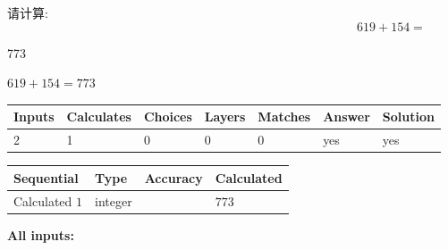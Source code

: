 \documentclass{ctexart}
\begin{document}
请计算:
\begin{equation}
619 +  %
154 = \nonumber
\end{equation}
 
 
 
\noindent{}
 
 

773
 
 
\noindent{}
 
 

 
 
 
\noindent{}
 
 

$ %
619 +  %
154=   %
773$
 
 
\noindent{}
 
 

 
   
   
   
   
\noindent\begin{tabular}{|l|l|l|l|l|l|l|}
 \hline
Inputs & Calculates & Choices & Layers & Matches & Answer & Solution \\ \hline
 2  & 
 1  & 
 0
  & 
 0  & 
 0  & 
  yes & 
  yes 
  \\ \hline
 \end{tabular}
   
   
   
   
\noindent{}
   
   
  
  
\noindent\begin{tabular}{|l|l|l|l|}
\hline
 Sequential & Type & Accuracy & Calculated \\ 
\hline
 
 
  Calculated $  1 $ & integer &  & 
  $ 773 $ 
 \\  \hline  
 \end{tabular}
   
   
   
   
\noindent\vspace{0.1in}\hspace{-0.08in} {\textbf{\Large{All inputs: }}}
   
   
  
\end{document}
